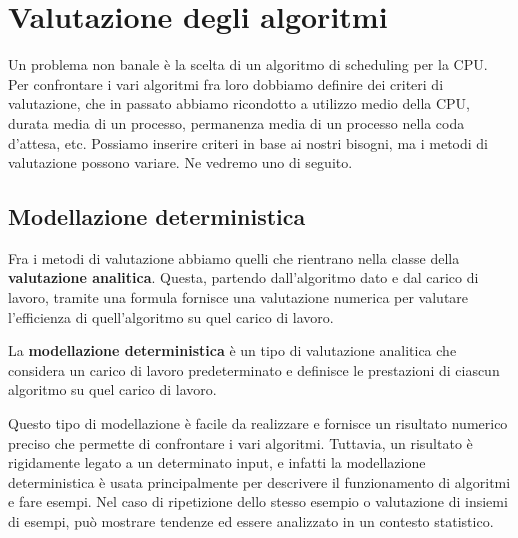 \section{Valutazione degli algoritmi}
    Un problema non banale è la scelta di un algoritmo di scheduling per la CPU. Per confrontare i vari algoritmi fra loro dobbiamo definire dei criteri di valutazione, che in passato abbiamo ricondotto a utilizzo medio della CPU, durata media di un processo, permanenza media di un processo nella coda d'attesa, etc. Possiamo inserire criteri in base ai nostri bisogni, ma i metodi di valutazione possono variare. Ne vedremo uno di seguito.
    
    \subsection{Modellazione deterministica}
        Fra i metodi di valutazione abbiamo quelli che rientrano nella classe della \textbf{valutazione analitica}. Questa, partendo dall'algoritmo dato e dal carico di lavoro, tramite una formula fornisce una valutazione numerica per valutare l'efficienza di quell'algoritmo su quel carico di lavoro.
        
        La \textbf{modellazione deterministica} è un tipo di valutazione analitica che considera un carico di lavoro predeterminato e definisce le prestazioni di ciascun algoritmo su quel carico di lavoro.
        
        Questo tipo di modellazione è facile da realizzare e fornisce un risultato numerico preciso che permette di confrontare i vari algoritmi. Tuttavia, un risultato è rigidamente legato a un determinato input, e infatti la modellazione deterministica è usata principalmente per descrivere il funzionamento di algoritmi e fare esempi. Nel caso di ripetizione dello stesso esempio o valutazione di insiemi di esempi, può mostrare tendenze ed essere analizzato in un contesto statistico.